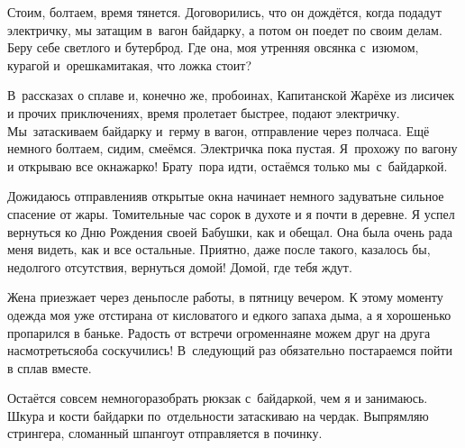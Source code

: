 Стоим, болтаем, время тянется. Договорились, что он дождётся, когда подадут электричку, мы затащим в~вагон байдарку, а потом он поедет по своим делам. Беру себе светлого и бутерброд. Где она, моя утренняя овсянка с~изюмом, курагой и~орешками\mdash такая, что ложка стоит?

В~рассказах о сплаве и, конечно же, пробоинах, Капитанской Жарёхе из лисичек и прочих приключениях, время пролетает быстрее, подают электричку. Мы~затаскиваем байдарку и~герму в вагон, отправление через полчаса. Ещё немного болтаем, сидим, смеёмся. Электричка пока пустая. Я~прохожу по вагону и открываю все окна\mdash жарко! Брату~пора идти, остаёмся только мы~с~байдаркой. 

Дожидаюсь отправления\mdash в открытые окна начинает немного задувать\mdash не сильное спасение от жары. Томительные час сорок в духоте и я почти в деревне. Я успел вернуться ко Дню Рождения своей Бабушки, как и обещал. Она была очень рада меня видеть, как и все остальные. Приятно, даже после такого, казалось бы, недолгого отсутствия, вернуться домой! Домой, где тебя ждут. 

Жена приезжает через день\mdash после работы, в пятницу вечером. К этому моменту одежда моя уже отстирана от кисловатого и едкого запаха дыма, а я хорошенько пропарился в баньке. Радость от встречи огроменная\mdash не можем друг на друга насмотреться\mdash оба соскучились! В~следующий раз обязательно постараемся пойти в сплав вместе. 

Остаётся совсем немного\mdash разобрать рюкзак с~байдаркой, чем я и занимаюсь. Шкура и кости байдарки по~отдельности затаскиваю на чердак. Выпрямляю стрингера, сломанный шпангоут отправляется в починку. 

\begin{center}
\end{center}
